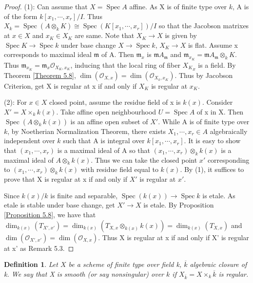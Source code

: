 \documentclass{ctexart}
\newtheorem{definition}{Definition}[section]
\newcommand{\spec}{\operatorname{Spec}}
\begin{document}
\begin{proof}
    (1): Can assume that $X = \spec A$ affine.
    As X is of finite type over $k$, A is of the form $k[x_{1}, \cdots, x_{r}]/I$.
    Thus $X_{k} = \spec(A \otimes_{k} K) \cong \spec(K[x_{1}, \cdots, x_{r}])/I$ so that the Jacobson matrixes at $x\in X$ and $x_{K}\in X_{K}$ are same.
    Note that $X_{K} \longrightarrow X$ is given by $\spec K \longrightarrow \spec k$ under base change $X \longrightarrow \spec k$, $X_{K} \longrightarrow X$ is flat.
    Assume x corresponds to maximal ideal $\mathfrak{m}$ of A.
    Then $\mathfrak{m}_{x}$ is $\mathfrak{m}A_{\mathfrak{m}}$ and $\mathfrak{m}_{x_{K}} = \mathfrak{m}A_{\mathfrak{m}} \otimes_{k} K$.
    Thus $\mathfrak{m}_{x_{K}} = \mathfrak{m}_{x}\mathcal{O}_{X_{K}, x_{K}}$, inducing that the local ring of fiber ${X_{K}}_{x}$ is a field.
    By Theorem \ref{Theorem 5.8}, $\dim(\mathcal{O}_{X, x}) = \dim(\mathcal{O}_{X_{k}, x_{K}})$.
    Thus by Jacobson Criterion, get X is regular at x if and only if $X_{K}$ is regular at $x_{K}$.
    \par
    (2): For $x\in X$ closed point, assume the residue field of x is $k(x)$.
    Consider $X' = X \times_{k} k(x)$.
    Take affine open neighbourhood $U = \spec A$ of x in X.
    Then $\spec(A \otimes_{k} k(x))$ is an affine open subset of $X'$.
    While A is of finite type over $k$, by Noetherian Normalization Theorem, there exists $X_{1}, \cdots, x_{r}\in A$ algebraically independent over $k$ such that A is integral over $k[x_{1}, \cdots, x_{r}]$.
    It is easy to show that $(x_{1}, \cdots, x_{r})$ is a maximal ideal of A so that $(x_{1}, \cdots, x_{r}) \otimes_{k} k(x)$ is a maximal ideal of $A \otimes_{k} k(x)$.
    Thus we can take the closed point $x'$ corresponding to $(x_{1}, \cdots, x_{r}) \otimes_{k} k(x)$ with residue field equal to $k(x)$.
    By (1), it suffices to prove that X is regular at x if and only if $X'$ is regular at $x'$.
    \par
    Since $k(x)/k$ is finite and separable, $\spec(k(x)) \longrightarrow \spec k$ is etale.
    As etale is stable under base change, get $X' \longrightarrow X$ is etale.
    By Proposition \ref{Proposition 5.8}, we have that $\dim_{k(x)}(T_{X', x'}) = \dim_{k(x)}(T_{X, x} \otimes_{k(x)} k(x)) = \dim_{k(x)}(T_{X, x})$ and $\dim(\mathcal{O}_{X', x'}) = \dim(\mathcal{O}_{X, x})$.
    Thus X is regular at x if and only if X' is regular at x' as Remark 5.3.
\end{proof}
\begin{definition}
    Let $X$ be a scheme of finite type over field k, $\overline{k}$ algebraic closure of k.
    We say that X is smooth (or say nonsingular) over $k$ if $X_{\overline{k}} = X \times_{k} \overline{k}$ is regular.
\end{definition}
\end{document}
